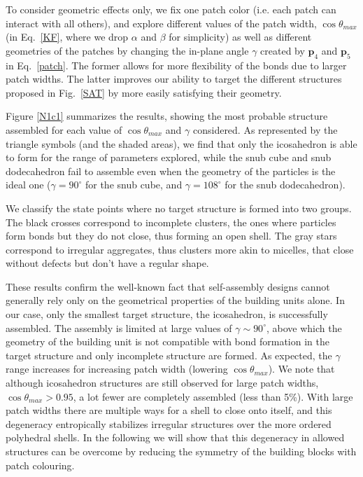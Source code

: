 \documentclass[a4paper, amsfonts, amssymb, amsmath, reprint, showkeys, nofootinbib, oneside]{revtex4-1}
\begin{document}
To consider geometric effects only, we fix one patch color (i.e. each patch can interact with all others), and explore different values of the patch width, $\cos\theta_{max}$ (in Eq.~\ref{KF}, where we drop $\alpha$ and $\beta$ for simplicity) as well as different geometries of the patches by changing the in-plane angle $\gamma$ created by $\textbf{p}_4$ and $\textbf{p}_5$ in Eq.~\ref{patch}. The former allows for more flexibility of the bonds due to larger patch widths. The latter improves our ability to target the different structures proposed in Fig.~\ref{SAT} by more easily satisfying their geometry.

Figure \ref{N1c1} summarizes the results, showing the most probable structure assembled for each value of $\cos\theta_{max}$ and $\gamma$ considered. As represented by the triangle symbols (and the shaded areas), we find that only the icosahedron is able to form for the range of parameters explored, while the snub cube and snub dodecahedron fail to assemble even when the geometry of the particles is the ideal one ($\gamma=90^\circ$ for the snub cube, and  $\gamma=108^\circ$ for the snub dodecahedron).

We classify the state points where no target structure is formed into two groups. The black crosses correspond to incomplete clusters, the ones where particles form bonds but they do not close, thus forming an open shell. The gray stars correspond to irregular aggregates, thus clusters more akin to micelles, that close without defects but don't have a regular shape.

These results confirm the well-known fact that self-assembly designs cannot generally rely only on the geometrical properties of the building units alone. In our case, only the smallest target structure, the icosahedron, is successfully assembled. The assembly is limited at large values of $\gamma\sim 90^\circ$, above which the geometry of the building unit is not compatible with bond formation in the target structure and only incomplete structure are formed. As expected, the $\gamma$ range increases for increasing patch width (lowering $\cos\theta_{max}$). We note that although icosahedron structures are still observed for large patch widths, $\cos\theta_{max}>0.95$, a lot fewer are completely assembled (less than 5\%). With large patch widths there are multiple ways for a shell to close onto itself, and this degeneracy entropically stabilizes irregular structures over the more ordered polyhedral shells. In the following we will show that this degeneracy in allowed structures can be overcome by reducing the symmetry of the building blocks with patch colouring.
\end{document}
